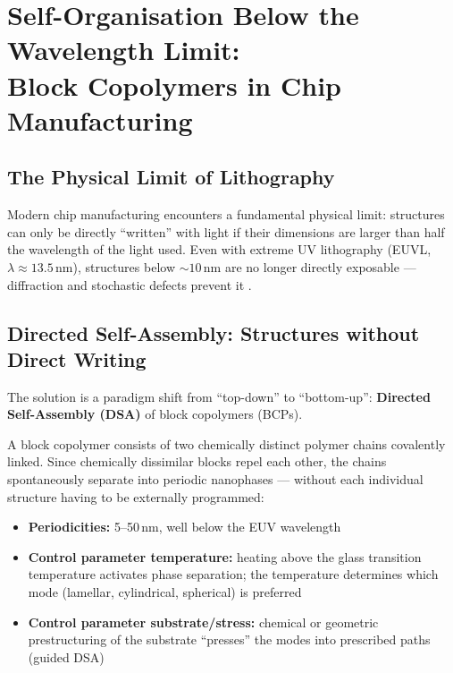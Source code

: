 \section{Self-Organisation Below the Wavelength Limit: \\
         Block Copolymers in Chip Manufacturing}

\subsection{The Physical Limit of Lithography}

Modern chip manufacturing encounters a fundamental physical limit:
structures can only be directly ``written'' with light if their
dimensions are larger than half the wavelength of the light used.
Even with extreme UV lithography (EUVL, $\lambda \approx 13.5\,\text{nm}$),
structures below $\sim 10\,\text{nm}$ are no longer directly exposable —
diffraction and stochastic defects prevent it \cite{DSA2026,Lee2025}.

\subsection{Directed Self-Assembly: Structures without Direct Writing}

The solution is a paradigm shift from ``top-down'' to ``bottom-up'':
\textbf{Directed Self-Assembly (DSA)} of block copolymers (BCPs).

A block copolymer consists of two chemically distinct polymer chains
covalently linked. Since chemically dissimilar blocks repel each
other, the chains spontaneously separate into periodic nanophases —
without each individual structure having to be externally programmed:

\begin{itemize}
  \item \textbf{Periodicities:} 5--50\,nm, well below the EUV wavelength
  \item \textbf{Control parameter temperature:} heating above the glass
    transition temperature activates phase separation; the temperature
    determines which mode (lamellar, cylindrical, spherical) is preferred
  \item \textbf{Control parameter substrate/stress:} chemical or geometric
    prestructuring of the substrate ``presses'' the modes into prescribed
    paths (guided DSA)
\end{itemize}

